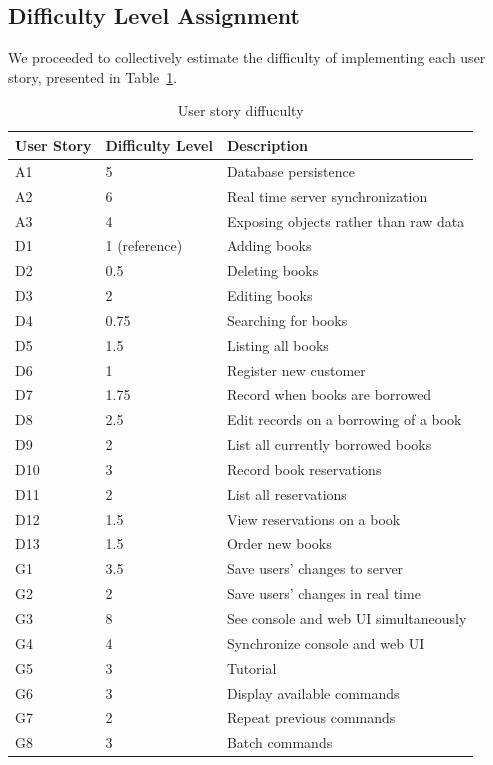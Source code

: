 \subsection*{Difficulty Level Assignment}
We proceeded to collectively estimate the difficulty of implementing each user story, presented in Table~\ref{table:userstory-difficulty}.

\begin{table}
\begin{tabular}{ | l | l | l | }
  \hline
  \textbf{User Story} & \textbf{Difficulty Level} & \textbf{Description} \\ \hline
  A1 & 5 			& Database persistence \\ \hline
  A2 & 6 			& Real time server synchronization \\ \hline
  A3 & 4 			& Exposing objects rather than raw data \\ \hline
  D1 & 1 (reference) 	& Adding books \\ \hline
  D2 & 0.5 			& Deleting books \\ \hline
  D3 & 2 			& Editing books \\ \hline
  D4 & 0.75 			& Searching for books \\ \hline
  D5 & 1.5 			& Listing all books \\ \hline
  D6 & 1 			& Register new customer \\ \hline
  D7 & 1.75 			& Record when books are borrowed \\ \hline
  D8 & 2.5 			& Edit records on a borrowing of a book \\ \hline
  D9 & 2 			& List all currently borrowed books \\ \hline
  D10 & 3 			& Record book reservations \\ \hline
  D11 & 2 			& List all reservations \\ \hline
  D12 & 1.5 			& View reservations on a book \\ \hline
  D13 & 1.5 			& Order new books \\ \hline
  G1 & 3.5 			& Save users' changes to server \\ \hline
  G2 & 2 			& Save users' changes in real time \\ \hline
  G3 & 8 			& See console and web UI simultaneously \\ \hline
  G4 & 4 			& Synchronize console and web UI \\ \hline
  G5 & 3 			& Tutorial \\ \hline
  G6 & 3 			& Display available commands \\ \hline
  G7 & 2 			& Repeat previous commands \\ \hline
  G8 & 3 			& Batch commands \\ \hline
\end{tabular}
\caption{User story diffuculty}
\label{table:userstory-difficulty}
\end{table}


